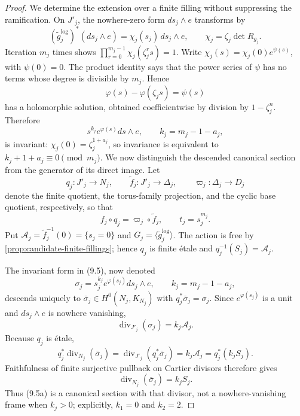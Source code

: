 \begin{proof}
We determine the extension over a finite filling without suppressing the
ramification.  On \(J'_j\), the nowhere-zero form \(ds_j\wedge e\)
transforms by
\[
 (\widetilde g_j^{\log})^*(ds_j\wedge e)
 =\chi_j(s_j)\,ds_j\wedge e,
 \qquad \chi_j=\zeta_j\det R_{g_j}.
\tag{9.4}
\]
Iteration \(m_j\) times shows
\(\prod_{r=0}^{m_j-1}\chi_j(\zeta_j^rs)=1\).
Write \(\chi_j(s)=\chi_j(0)e^{\psi(s)}\), with \(\psi(0)=0\).
The product identity says that the power series of \(\psi\) has no terms
whose degree is divisible by \(m_j\).  Hence
\[
 \varphi(s)-\varphi(\zeta_js)=\psi(s)
\]
has a holomorphic solution, obtained coefficientwise by division by
\(1-\zeta_j^n\).  Therefore
\[
 s^{k_j}e^{\varphi(s)}ds\wedge e,
 \qquad k_j=m_j-1-a_j,
\tag{9.5}
\]
is invariant: \(\chi_j(0)=\zeta_j^{1+a_j}\), so invariance is equivalent
to \(k_j+1+a_j\equiv0\pmod {m_j}\).  We now distinguish the descended
canonical section from the generator of its direct image.  Let
\[
 q_j:J'_j\longrightarrow N_j,\qquad
 \widetilde f_j:J'_j\longrightarrow\Delta_j,\qquad
 \varpi_j:\Delta_j\longrightarrow D_j
\]
denote the finite quotient, the torus-family projection, and the cyclic base
quotient, respectively, so that
\[
 f_j\circ q_j=\varpi_j\circ\widetilde f_j,
 \qquad t_j=s_j^{m_j}.
\]
Put \(\mathcal A_j=\widetilde f_j^{-1}(0)=\{s_j=0\}\) and
\(G_j=\langle\widetilde g_j^{\log}\rangle\).  The action is free by
\cref{prop:candidate-finite-fillings}; hence \(q_j\) is finite \'etale
and \(q_j^{-1}(S_j)=\mathcal A_j\).

The invariant form in (9.5), now denoted
\[
 \sigma_j=s_j^{k_j}e^{\varphi(s_j)}ds_j\wedge e,
 \qquad k_j=m_j-1-a_j,
\tag{9.5a}
\]
descends uniquely to
\(\overline\sigma_j\in H^0(N_j,K_{N_j})\) with
\(q_j^*\overline\sigma_j=\sigma_j\).  Since \(e^{\varphi(s_j)}\) is a
unit and \(ds_j\wedge e\) is nowhere vanishing,
\[
 \operatorname{div}_{J'_j}(\sigma_j)=k_j\mathcal A_j.
\]
Because \(q_j\) is \'etale,
\[
 q_j^*\operatorname{div}_{N_j}(\overline\sigma_j)
 =\operatorname{div}_{J'_j}(q_j^*\overline\sigma_j)
 =k_j\mathcal A_j=q_j^*(k_jS_j).
\]
Faithfulness of finite surjective pullback on Cartier divisors therefore gives
\[
 \operatorname{div}_{N_j}(\overline\sigma_j)=k_jS_j.
\tag{9.5b}
\]
Thus (9.5a) is a canonical section with that divisor, not a nowhere-vanishing
frame when \(k_j>0\); explicitly, \(k_1=0\) and \(k_2=2\).


\end{proof}
